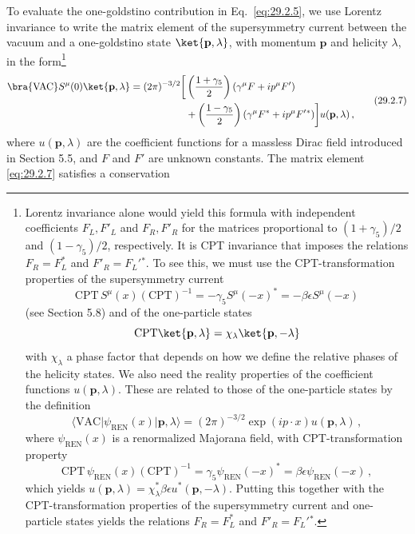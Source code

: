 To evaluate the one-goldstino contribution in Eq.~\eqref{eq:29.2.5}, we
use Lorentz invariance to write the matrix element of the supersymmetry
current between the vacuum and a one-goldstino state
\(\ket{\mathbf p,\lambda}\), with momentum \(\mathbf p\) and
helicity \(\lambda\), in the form\footnote{Lorentz invariance alone would
yield this formula with independent coefficients \(F_L,F'_L\) and
\(F_R,F'_R\) for the matrices proportional to \((1+\gamma_5)/2\) and
\((1-\gamma_5)/2\), respectively. It is CPT invariance that imposes the
relations \(F_R=F_L^*\) and \(F'_R=F_L'{}^*\). To see this, we must use the
CPT-transformation properties of the supersymmetry current
\[
  \mathrm{CPT}\,S^\mu(x)(\mathrm{CPT})^{-1}
  =-\gamma_5S^\mu(-x)^*
  =-\beta\epsilon S^\mu(-x)
\]
(see Section 5.8) and of the one-particle states
\[
  \mathrm{CPT}\ket{\mathbf p,\lambda}
  =\chi_\lambda\ket{\mathbf p,-\lambda}
\]
with \(\chi_\lambda\) a phase factor that depends on how we define the
relative phases of the helicity states. We also need the reality
properties of the coefficient functions \(u(\mathbf p,\lambda)\). These
are related to those of the one-particle states by the definition
\[
  \langle\mathrm{VAC}\lvert\psi_{\mathrm{REN}}(x)
  \rvert\mathbf p,\lambda\rangle
  =(2\pi)^{-3/2}\exp(ip\mathbin{\cdot}x)u(\mathbf p,\lambda)\,,
\]
where \(\psi_{\mathrm{REN}}(x)\) is a renormalized Majorana field, with
CPT-transformation property
\[
  \mathrm{CPT}\,\psi_{\mathrm{REN}}(x)(\mathrm{CPT})^{-1}
  =\gamma_5\psi_{\mathrm{REN}}(-x)^*
  =\beta\epsilon\psi_{\mathrm{REN}}(-x)\,,
\]
which yields
\(u(\mathbf p,\lambda)=\chi_\lambda^*\beta\epsilon
u^*(\mathbf p,-\lambda)\). Putting this together with the
CPT-transformation properties of the supersymmetry current and
one-particle states yields the relations \(F_R=F_L^*\) and
\(F'_R=F_L'{}^*\).}
\begin{equation}
  \begin{aligned}
  \bra{\mathrm{VAC}} S^\mu(0)\ket{\mathbf p,\lambda}
  =(2\pi)^{-3/2}
  \biggl[
    &\left(\frac{1+\gamma_5}{2}\right)
      \left(\gamma^\mu F+ip^\mu F'\right)
  \\
    &+\left(\frac{1-\gamma_5}{2}\right)
      \left(\gamma^\mu F^*+ip^\mu F'{}^*\right)
  \biggr]u(\mathbf p,\lambda)\,,
  \end{aligned}
  \tag{29.2.7}\label{eq:29.2.7}
\end{equation}
where \(u(\mathbf p,\lambda)\) are the coefficient functions for a massless
Dirac field introduced in Section 5.5, and \(F\) and \(F'\) are unknown
constants. The matrix element \eqref{eq:29.2.7} satisfies a conservation
